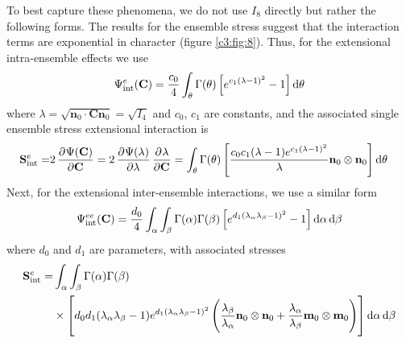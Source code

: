     
    To best capture these phenomena, we do not use $I_8$ directly but rather the following forms. The results for the ensemble stress suggest that the interaction terms are exponential in character (figure \ref{c3:fig:8}). Thus, for the extensional intra-ensemble effects we use
        \begin{equation}\label{c3:eqn:410}
        \begin{aligned}
        \Psi_\mathrm{int}^e(\mathbf{C}) = \frac{c_0}{4}\int_\theta\Gamma(\theta)\left[e^{c_1(\lambda-1)^2} - 1\right]\dif \theta
        \end{aligned}
        \end{equation}
    where $\lambda = \sqrt{\mathbf{n}_0\cdot\mathbf{C}\mathbf{n}_0} = \sqrt{I_4}$ and $c_0$, $c_1$ are constants, and the associated single ensemble stress extensional interaction is
        \begin{equation}\label{c3:eqn:411}
        \begin{aligned}
        \mathbf{S}_\mathrm{int}^e =& 2\dpd{\Psi(\mathbf{C})}{\mathbf{C}} = 2 \dpd{\Psi(\lambda)}{\lambda}\dpd{\lambda}{\mathbf{C}}
        = \int_\theta \Gamma(\theta)\left[\frac{c_0c_1(\lambda-1)e^{c_1(\lambda-1)^2}}{\lambda}\mathbf{n}_0\otimes\mathbf{n}_0\right]\dif \theta
        \end{aligned}
        \end{equation}
    Next, for the extensional inter-ensemble interactions, we use a similar form
        \begin{equation}\label{c3:eqn:412}
        \begin{aligned}
        \Psi_\mathrm{int}^{ee}(\mathbf{C}) = \frac{d_0}{4}\int_\alpha\int_\beta\Gamma(\alpha)\Gamma(\beta)\left[e^{d_1(\lambda_\alpha\lambda_\beta-1)^2} - 1\right]\dif \alpha \dif\beta
        \end{aligned}
        \end{equation}
    where $d_0$ and $d_1$ are parameters, with associated stresses
        \begin{equation}\label{c3:eqn:413}
        \begin{aligned}
        \mathbf{S}_\mathrm{int}^e =& \int_\alpha\int_\beta \Gamma(\alpha)\Gamma(\beta) \\
        &\times\left[d_0d_1(\lambda_\alpha\lambda_\beta-1)e^{d_1(\lambda_\alpha\lambda_\beta-1)^2}\left(\frac{\lambda_\beta}{\lambda_\alpha}\mathbf{n}_0\otimes\mathbf{n}_0 + \frac{\lambda_\alpha}{\lambda_\beta}\mathbf{m}_0\otimes\mathbf{m}_0\right)\right]\dif\alpha\dif\beta
        \end{aligned}
        \end{equation}


